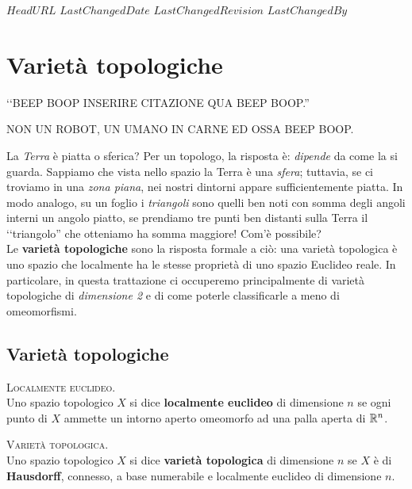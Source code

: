 \svnidlong
{$HeadURL$}
{$LastChangedDate$}
{$LastChangedRevision$}
{$LastChangedBy$}

\chapter{Varietà topologiche}

\begin{introduction}
	‘‘BEEP BOOP INSERIRE CITAZIONE QUA BEEP BOOP.''
	\begin{flushright}
		\textsc{NON UN ROBOT,} UN UMANO IN CARNE ED OSSA BEEP BOOP.
	\end{flushright}
\end{introduction}

\noindent La \textit{Terra} è piatta o sferica? Per un topologo, la risposta è: \textit{dipende} da come la si guarda. Sappiamo che vista nello spazio la Terra è una \textit{sfera}; tuttavia, se ci troviamo in una \textit{zona piana}, nei nostri dintorni appare sufficientemente piatta. In modo analogo, su un foglio i \textit{triangoli} sono quelli ben noti con somma degli angoli interni un angolo piatto, se prendiamo tre punti ben distanti sulla Terra il ‘‘triangolo'' che otteniamo ha somma maggiore! Com'è possibile?\\
Le \textbf{varietà topologiche} sono la risposta formale a ciò: una varietà topologica è uno spazio che localmente ha le stesse proprietà di uno spazio Euclideo reale. In particolare, in questa trattazione ci occuperemo principalmente di varietà topologiche di \textit{dimensione 2} e di come poterle classificarle a meno di omeomorfismi.
\section{Varietà topologiche}
\begin{define}\textsc{Localmente euclideo.}\\
	Uno spazio topologico $X$ si dice \textbf{localmente euclideo} di dimensione $n$ se ogni punto di $X$ ammette un intorno aperto omeomorfo ad una palla aperta di $\mathbb{R}^n$.
\end{define}

\begin{define}\textsc{Varietà topologica.}\\
	Uno spazio topologico $X$ si dice \textbf{varietà topologica} di dimensione $n$ se $X$ è di \textbf{Hausdorff}, connesso, a base numerabile e localmente euclideo di dimensione $n$.
\end{define}

